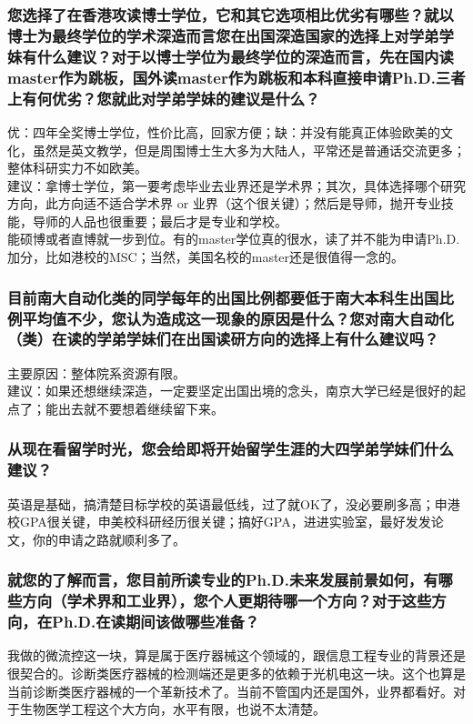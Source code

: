 \documentclass[a4paper,UTF8]{book}
\begin{document}
    \subsubsection*{您选择了在香港攻读博士学位，它和其它选项相比优劣有哪些？就以博士为最终学位的学术深造而言您在出国深造国家的选择上对学弟学妹有什么建议？对于以博士学位为最终学位的深造而言，先在国内读master作为跳板，国外读master作为跳板和本科直接申请Ph.D.三者上有何优劣？您就此对学弟学妹的建议是什么？}
    优：四年全奖博士学位，性价比高，回家方便；缺：并没有能真正体验欧美的文化，虽然是英文教学，但是周围博士生大多为大陆人，平常还是普通话交流更多；整体科研实力不如欧美。\\
    建议：拿博士学位，第一要考虑毕业去业界还是学术界；其次，具体选择哪个研究方向，此方向适不适合学术界 or 业界（这个很关键）；然后是导师，抛开专业技能，导师的人品也很重要；最后才是专业和学校。\\
    能硕博或者直博就一步到位。有的master学位真的很水，读了并不能为申请Ph.D.加分，比如港校的MSC；当然，美国名校的master还是很值得一念的。

    \subsubsection*{目前南大自动化类的同学每年的出国比例都要低于南大本科生出国比例平均值不少，您认为造成这一现象的原因是什么？您对南大自动化（类）在读的学弟学妹们在出国读研方向的选择上有什么建议吗？}
    主要原因：整体院系资源有限。\\
    建议：如果还想继续深造，一定要坚定出国出境的念头，南京大学已经是很好的起点了；能出去就不要想着继续留下来。

    \subsubsection*{从现在看留学时光，您会给即将开始留学生涯的大四学弟学妹们什么建议？}
    英语是基础，搞清楚目标学校的英语最低线，过了就OK了，没必要刷多高；申港校GPA很关键，申美校科研经历很关键；搞好GPA，进进实验室，最好发发论文，你的申请之路就顺利多了。

    \subsubsection*{就您的了解而言，您目前所读专业的Ph.D.未来发展前景如何，有哪些方向（学术界和工业界），您个人更期待哪一个方向？对于这些方向，在Ph.D.在读期间该做哪些准备？}
    我做的微流控这一块，算是属于医疗器械这个领域的，跟信息工程专业的背景还是很契合的。诊断类医疗器械的检测端还是更多的依赖于光机电这一块。这个也算是当前诊断类医疗器械的一个革新技术了。当前不管国内还是国外，业界都看好。对于生物医学工程这个大方向，水平有限，也说不太清楚。
                    
\end{document}
